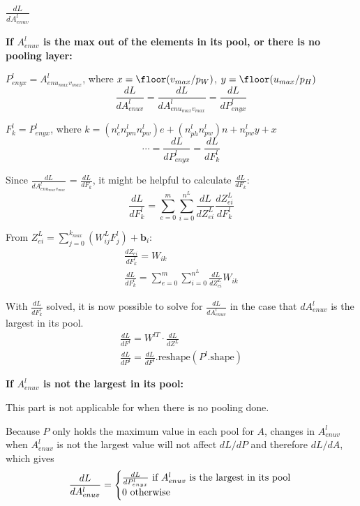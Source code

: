 \documentclass[12pt]{article}
\begin{document}
\subsubsection{$\frac{dL}{dA^l_{enuv}}$}

\textbf{If $A^l_{enuv}$ is the max out of the elements in its pool, or there is no pooling layer:}

$P^l_{enyx} = A^l_{enu_{max}v_{max}}$, where $x = \floor(v_{max}/p_{W})$, $y = \floor(u_{max}/p_H)$
\[ \frac{dL}{dA^l_{enuv}} = \frac{dL}{dA^l_{enu_{max}v_{max}}} = \frac{dL}{dP^l_{enyx}} \]

$F^l_k = P^l_{enyx}$, where $k = (n_c^l n_{pm}^l n_{pw}^l)e + (n_{ph}^l n_{pw}^l) n + n_{pw}^l y + x$
\[ \cdots = \frac{dL}{dP^l_{enyx}} = \frac{dL}{dF^l_k} \]

Since $\frac{dL}{dA^l_{enu_{max}v_{max}}}$ = $\frac{dL}{dF_k}$, it might be helpful to calculate
$\frac{dL}{dF_k}$:
\[ \frac{dL}{dF^l_k} = \sum_{e=0}^m \sum_{i=0}^{n^L} \frac{dL}{dZ^L_{ei}} \frac{dZ^L_{ei}}{dF^l_k} \]

From $Z^L_{ei} = \sum_{j=0}^{k_{max}} (W^L_{ij} F^l_j) + \bm b_i$:
\begin{gather*}
    \frac{dZ_{ei}}{dF^l_k} = W_{ik}\\
    \frac{dL}{dF^l_k} = \sum_{e=0}^m \sum_{i=0}^{n^L} \frac{dL}{dZ^L_{ei}} W_{ik}
\end{gather*}

With $\frac{dL}{dF^l_k}$ solved, it is now possible to solve for $\frac{dL}{dA^l_{enuv}}$ in
the case that $dA^l_{enuv}$ is the largest in its pool.
\begin{gather*}
    \frac{dL}{dF^l} = W^{l T} \cdot \frac{dL}{dZ^L}\\
    \frac{dL}{dP^l} = \frac{dL}{dF^l}\text{.reshape}(P^l\text{.shape})
\end{gather*}

\textbf{If $A^l_{enuv}$ is not the largest in its pool:}

This part is not applicable for when there is no pooling done.

Because $P$ only holds the maximum value in each pool for $A$, changes in $A^l_{enuv}$ when $A^l_{enuv}$
is not the largest value will not affect $dL/dP$ and therefore $dL/dA$, which gives
\[
    \frac{dL}{dA^l_{enuv}} =
    \left\{\begin{array}{@{}l@{}}
            \frac{dL}{dP^l_{enyx}} \text{ if $A^l_{enuv}$ is the largest in its pool}\\
            0 \text{ otherwise}
    \end{array}\right.\,
\]
\end{document}

